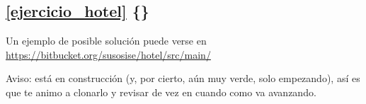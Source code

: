 \documentclass[spanish,12pt,a4paper,final,oneside]{book}
\begin{document}










\vspace{1cm}
\subsection*{\ref{ejercicio_hotel} \{\}}

Un ejemplo de posible solución puede verse en
\\\url{https://bitbucket.org/susosise/hotel/src/main/}

Aviso: está en construcción (y, por cierto, aún muy verde, solo empezando), así es que te animo a clonarlo y revisar de vez en cuando como va avanzando.
\end{document}
